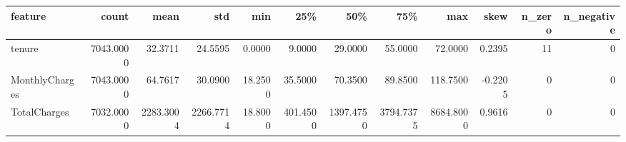 \begin{tabular}{lrrrrrrrrrrr}
\toprule
feature & count & mean & std & min & 25\% & 50\% & 75\% & max & skew & n\_zero & n\_negative \\
\midrule
tenure & 7043.0000 & 32.3711 & 24.5595 & 0.0000 & 9.0000 & 29.0000 & 55.0000 & 72.0000 & 0.2395 & 11 & 0 \\
MonthlyCharges & 7043.0000 & 64.7617 & 30.0900 & 18.2500 & 35.5000 & 70.3500 & 89.8500 & 118.7500 & -0.2205 & 0 & 0 \\
TotalCharges & 7032.0000 & 2283.3004 & 2266.7714 & 18.8000 & 401.4500 & 1397.4750 & 3794.7375 & 8684.8000 & 0.9616 & 0 & 0 \\
\bottomrule
\end{tabular}
